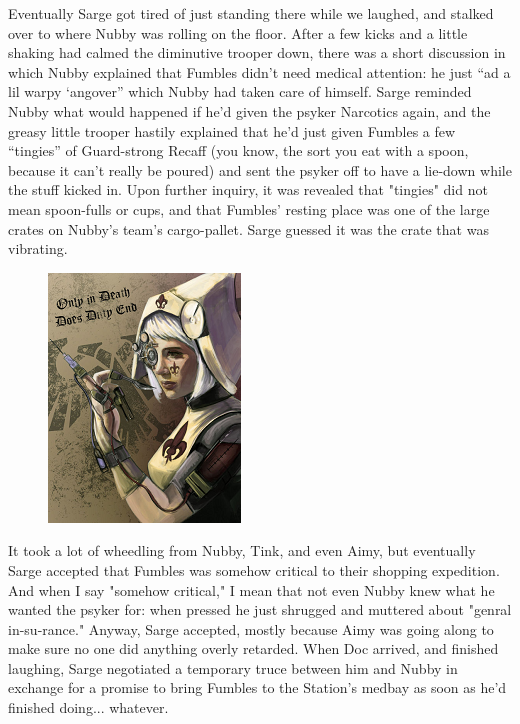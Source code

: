 Eventually Sarge got tired of just standing there while we laughed, and stalked over to where Nubby was rolling on the floor. 
After a few kicks and a little shaking had calmed the diminutive trooper down, there was a short discussion in which Nubby explained that Fumbles didn’t need medical attention: 
he just “ad a lil warpy ‘angover” which Nubby had taken care of himself. 
Sarge reminded Nubby what would happened if he’d given the psyker Narcotics again, and the greasy little trooper hastily explained that he’d just given Fumbles a few “tingies” of Guard-strong Recaff (you know, the sort you eat with a spoon, because it can't really be poured) and sent the psyker off to have a lie-down while the stuff kicked in. 
Upon further inquiry, it was revealed that "tingies" did not mean spoon-fulls or cups, and that Fumbles' resting place was one of the large crates on Nubby's team's cargo-pallet. 
Sarge guessed it was the crate that was vibrating.

\begin{figure}
	\begin{center}
		\includegraphics[width=\figwidth]{pics/14/6.png}
	\end{center}
\end{figure}
It took a lot of wheedling from Nubby, Tink, and even Aimy, but eventually Sarge accepted that Fumbles was somehow critical to their shopping expedition. 
And when I say "somehow critical," I mean that not even Nubby knew what he wanted the psyker for: 
when pressed he just shrugged and muttered about "genral in-su-rance." Anyway, Sarge accepted, mostly because Aimy was going along to make sure no one did anything overly retarded. 
When Doc arrived, and finished laughing, Sarge negotiated a temporary truce between him and Nubby in exchange for a promise to bring Fumbles to the Station's medbay as soon as he'd finished doing... 
whatever.

